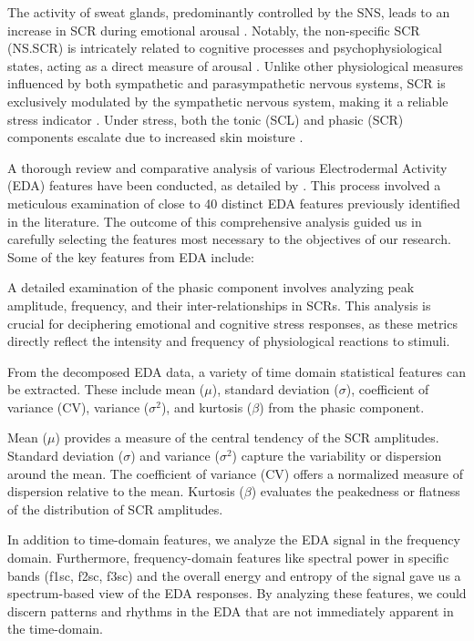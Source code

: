 The activity of sweat glands, predominantly controlled by the SNS, leads to an increase in SCR during emotional arousal \parencite{electrodermal}. Notably, the non-specific SCR (NS.SCR) is intricately related to cognitive processes and psychophysiological states, acting as a direct measure of arousal \parencite{177}. Unlike other physiological measures influenced by both sympathetic and parasympathetic nervous systems, SCR is exclusively modulated by the sympathetic nervous system, making it a reliable stress indicator \parencite{7}. Under stress, both the tonic (SCL) and phasic (SCR) components escalate due to increased skin moisture \parencite{stress}.

A thorough review and comparative analysis of various Electrodermal Activity (EDA) features have been conducted, as detailed by \textcite{EDAFeatures}. This process involved a meticulous examination of close to 40 distinct EDA features previously identified in the literature. The outcome of this comprehensive analysis guided us in carefully selecting the features most necessary to the objectives of our research.
Some of the key features from EDA include:

A detailed examination of the phasic component involves analyzing peak amplitude, frequency, and their inter-relationships in SCRs. This analysis is crucial for deciphering emotional and cognitive stress responses, as these metrics directly reflect the intensity and frequency of physiological reactions to stimuli.

From the decomposed EDA data, a variety of time domain statistical features can be extracted. These include mean ($\mu$), standard deviation ($\sigma$), coefficient of variance (CV), variance ($\sigma^2$), and kurtosis ($\beta$) from the phasic component.

Mean ($\mu$) provides a measure of the central tendency of the SCR amplitudes.
Standard deviation ($\sigma$) and variance ($\sigma^2$) capture the variability or dispersion around the mean.
The coefficient of variance (CV) offers a normalized measure of dispersion relative to the mean.
Kurtosis ($\beta$) evaluates the peakedness or flatness of the distribution of SCR amplitudes.

In addition to time-domain features, we analyze the EDA signal in the frequency domain. Furthermore, frequency-domain features like spectral power in specific bands (f1sc, f2sc, f3sc) and the overall energy and entropy of the signal gave us a spectrum-based view of the EDA responses. By analyzing these features, we could discern patterns and rhythms in the EDA that are not immediately apparent in the time-domain.


